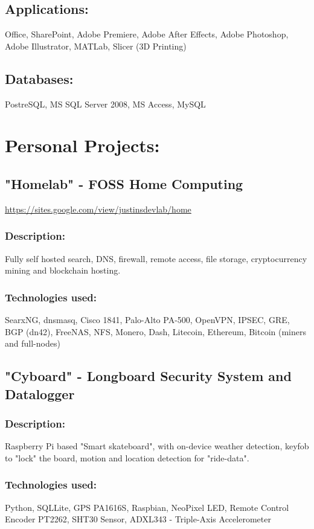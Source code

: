 \documentclass[letter,10pt]{article}
\begin{document}
\subsection*{Applications:}
\label{sec:org33f7f95}
Office, SharePoint, Adobe Premiere, Adobe After Effects, Adobe Photoshop, Adobe Illustrator, MATLab, Slicer (3D Printing)
\subsection*{Databases:}
\label{sec:org13ffc3b}
PostreSQL, MS SQL Server 2008, MS Access, MySQL
\section*{Personal Projects:}
\label{sec:orgc20e76c}
\subsection*{"Homelab" - FOSS Home Computing}
\label{sec:org6ebe8f8}
\url{https://sites.google.com/view/justinsdevlab/home}
\subsubsection*{Description:}
\label{sec:org43625f3}
Fully self hosted search, DNS, firewall, remote access, file storage, cryptocurrency mining and blockchain hosting.
\subsubsection*{Technologies used:}
\label{sec:orga09bbda}
SearxNG, dnsmasq, Cisco 1841, Palo-Alto PA-500, OpenVPN, IPSEC, GRE, BGP (dn42), FreeNAS, NFS, Monero, Dash, Litecoin, Ethereum, Bitcoin (miners and full-nodes)

\subsection*{"Cyboard" - Longboard Security System and Datalogger}
\label{sec:org1603807}
\subsubsection*{Description:}
\label{sec:org1bd91f4}
Raspberry Pi based "Smart skateboard", with on-device weather detection, keyfob to "lock" the board, motion and location detection for "ride-data".
\subsubsection*{Technologies used:}
\label{sec:org372c60d}
Python, SQLLite, GPS PA1616S, Raspbian, NeoPixel LED, Remote Control Encoder PT2262, SHT30 Sensor, ADXL343 - Triple-Axis Accelerometer
\end{document}
